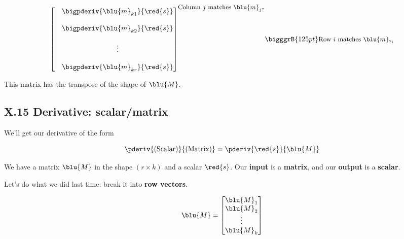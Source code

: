 \begin{definition}
\begin{equation*}
{\begin{bmatrix}
                        &
                        \begin{matrix}
                            \bigpderiv{ \blu{m}_{k1} }   { \red{s} }\\ 
                            \\
                            \bigpderiv{ \blu{m}_{k2} }   { \red{s} }\\ 
                            \\
                            \vdots \\ 
                            \\
                            \bigpderiv{ \blu{m}_{kr} }   { \red{s} }
                        \end{matrix}
                    \end{bmatrix}
                }^{ \text{\small Column $j$ matches $\blu{m}_{j?}$} }
                \bigggrB{125pt} \text{\small Row $i$ matches $\blu{m}_{?i}$} 
            \end{equation*}
            
            This matrix has the transpose of the shape of $\blu{M}$.
        \end{definition}
    
    \secdiv
        
    \subsection*{X.15 \quad Derivative: scalar/matrix}
    
        We'll get our derivative of the form 
        
        \begin{equation}
            \pderiv{ \text{(Scalar)} } { \text{(Matrix)} } 
            =
            \pderiv{ \red{s} }{ \blu{M} } 
        \end{equation}
        
        We have a matrix $\blu{M}$ in the shape $(r \times k)$ and a scalar $\red{s}$. Our \textbf{input} is a \textbf{matrix}, and our \textbf{output} is a \textbf{scalar}.
        
        Let's do what we did last time: break it into \textbf{row vectors}.
        
        \begin{equation}
            \blu{M}
            =
            \begin{bmatrix}
                \blu{M}_1 \\ \blu{M}_2 \\ \vdots \\ \blu{M}_k
            \end{bmatrix}
        \end{equation}
        
